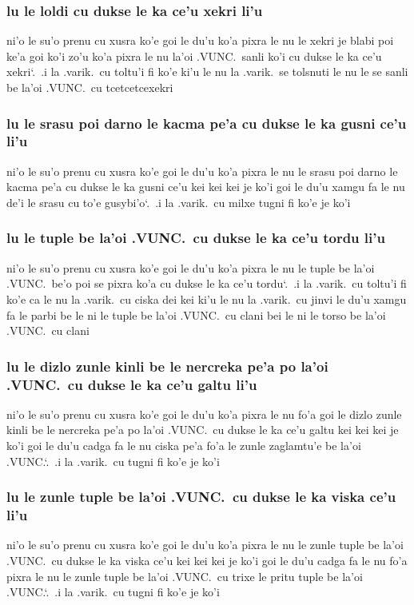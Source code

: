 \documentclass{report}
\newcommand\sds{\spacefactor\sfcode`.\ \space}
\begin{document}
\subsubsection{lu le loldi cu dukse le ka ce'u xekri li'u}
ni'o le su'o prenu cu xusra ko'e goi le du'u ko'a pixra le nu le xekri je blabi poi ke'a goi ko'i zo'u ko'a pixra le nu la'oi .VUNC.\ sanli ko'i cu dukse le ka ce'u xekri\sds  .i la .varik.\ cu toltu'i fi ko'e ki'u le nu la .varik.\ se tolsnuti le nu le se sanli be la'oi .VUNC.\ cu tcetcetcexekri

\subsubsection{lu le srasu poi darno le kacma pe'a cu dukse le ka gusni ce'u li'u}
ni'o le su'o prenu cu xusra ko'e goi le du'u ko'a pixra le nu le srasu poi darno le kacma pe'a cu dukse le ka gusni ce'u kei kei kei je ko'i goi le du'u xamgu fa le nu de'i le srasu cu to'e gusybi'o\sds  .i la .varik.\ cu milxe tugni fi ko'e je ko'i

\subsubsection{lu le tuple be la'oi .VUNC.\ cu dukse le ka ce'u tordu li'u}
ni'o le su'o prenu cu xusra ko'e goi le du'u ko'a pixra le nu le tuple be la'oi .VUNC.\ be'o poi se pixra ko'a cu dukse le ka ce'u tordu\sds  .i la .varik.\ cu toltu'i fi ko'e ca le nu la .varik.\ cu ciska dei kei ki'u le nu la .varik.\ cu jinvi le du'u xamgu fa le parbi be le ni le tuple be la'oi .VUNC.\ cu clani bei le ni le torso be la'oi .VUNC.\ cu clani

\subsubsection{lu le dizlo zunle kinli be le nercreka pe'a po la'oi .VUNC.\ cu dukse le ka ce'u galtu li'u}
ni'o le su'o prenu cu xusra ko'e goi le du'u ko'a pixra le nu fo'a goi le dizlo zunle kinli be le nercreka pe'a po la'oi .VUNC.\ cu dukse le ka ce'u galtu kei kei kei je ko'i goi le du'u cadga fa le nu ciska pe'a fo'a le zunle zaglamtu'e be la'oi .VUNC.\sds  .i la .varik.\ cu tugni fi ko'e je ko'i

\subsubsection{lu le zunle tuple be la'oi .VUNC.\ cu dukse le ka viska ce'u li'u}
ni'o le su'o prenu cu xusra ko'e goi le du'u ko'a pixra le nu le zunle tuple be la'oi .VUNC.\ cu dukse le ka viska ce'u kei kei kei je ko'i goi le du'u cadga fa le nu fo'a pixra le nu le zunle tuple be la'oi .VUNC.\ cu trixe le pritu tuple be la'oi .VUNC.\sds  .i la .varik.\ cu tugni fi ko'e je ko'i
\end{document}
